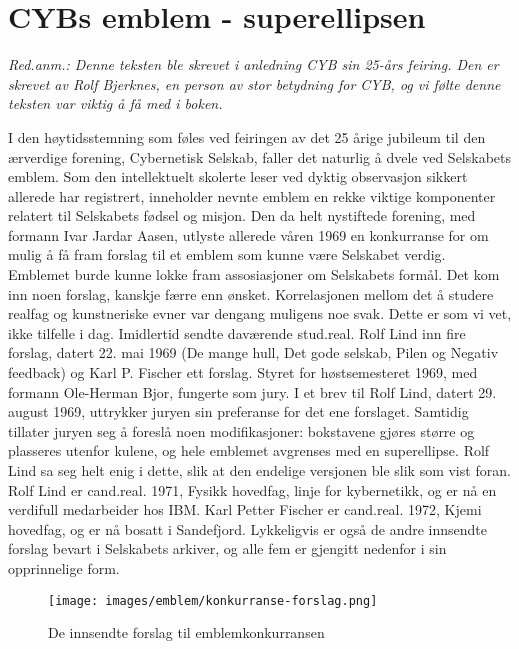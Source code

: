 \chapter{CYBs emblem - superellipsen}

\author{Skrevet av Rolf Bjerknes}

\textit{Red.anm.: Denne teksten ble skrevet i anledning CYB sin 25-års feiring. Den er skrevet av Rolf Bjerknes, en person av stor betydning for CYB, og vi følte denne teksten var viktig å få med i boken.}

I den høytidsstemning som føles ved feiringen av det 25 årige jubileum til den ærverdige forening, Cybernetisk Selskab, faller det naturlig å dvele ved Selskabets emblem. Som den intellektuelt skolerte leser ved dyktig observasjon sikkert allerede har registrert, inneholder nevnte emblem en rekke viktige komponenter relatert til Selskabets fødsel og misjon. Den da helt nystiftede forening, med formann Ivar Jardar Aasen, utlyste allerede våren 1969 en konkurranse for om mulig å få fram forslag til et emblem som kunne være Selskabet verdig. Emblemet burde kunne lokke fram assosiasjoner om Selskabets formål. Det kom inn noen forslag, kanskje færre enn ønsket. Korrelasjonen mellom det å studere realfag og kunstneriske evner var dengang muligens noe svak. Dette er som vi vet, ikke tilfelle i dag. Imidlertid sendte daværende stud.real. Rolf Lind inn fire forslag, datert 22. mai 1969 (De mange hull, Det gode selskab, Pilen og Negativ feedback) og Karl P. Fischer ett forslag. Styret for høstsemesteret 1969, med formann Ole-Herman Bjor, fungerte som jury. I et brev til Rolf Lind, datert 29. august 1969, uttrykker juryen sin preferanse for det ene forslaget. Samtidig tillater juryen seg å foreslå noen modifikasjoner: bokstavene gjøres større og plasseres utenfor kulene, og hele emblemet avgrenses med en superellipse. Rolf Lind sa seg helt enig i dette, slik at den endelige versjonen ble slik som vist foran. Rolf Lind er cand.real. 1971, Fysikk hovedfag, linje for kybernetikk, og er nå en verdifull medarbeider hos IBM. Karl Petter Fischer er cand.real. 1972, Kjemi hovedfag, og er nå bosatt i Sandefjord. Lykkeligvis er også de andre innsendte forslag bevart i Selskabets arkiver, og alle fem er gjengitt nedenfor i sin opprinnelige form.

\begin{figure}
	\texttt{[image: images/emblem/konkurranse-forslag.png]}
	\label{fig:konkurranse-forslag}
	\caption{De innsendte forslag til emblemkonkurransen}
\end{figure}

